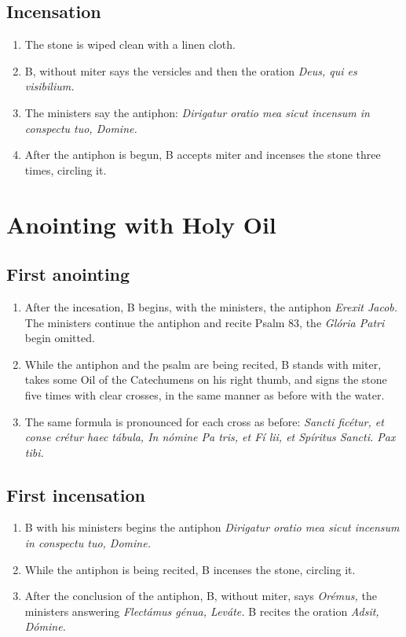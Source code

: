 \documentclass[twocolumn]{report}
\begin{document}
\subsection{Incensation}
\begin{enumerate}
	\item The stone is wiped clean with a linen cloth.
	\item B, without miter says the versicles and then the oration \textit{Deus, qui es visibilium.}
	\item The ministers say the antiphon: \textit{Dirigatur oratio mea sicut incensum in conspectu tuo, Domine.}
	\item After the antiphon is begun, B accepts miter and incenses the stone three times, circling it.
\end{enumerate}
\section{Anointing with Holy Oil}
\subsection{First anointing}
\begin{enumerate}
	\item After the incesation, B begins, with the ministers, the antiphon \textit{Erexit Jacob.} The ministers continue the antiphon and recite Psalm 83, the \textit{Glória Patri} begin omitted.
	\item While the antiphon and the psalm are being recited, B stands with miter, takes some Oil of the Catechumens on his right thumb, and signs the stone five times with clear crosses, in the same manner as before with the water. 
	\item The same formula is pronounced for each cross as before: \textit{Sancti  ficétur, et conse  crétur haec tábula, In nómine Pa  tris, et Fí  lii, et Spíritus  Sancti. Pax tibi.}
\end{enumerate}
\subsection{First incensation}
\begin{enumerate}
	\item B with his ministers begins the antiphon \textit{Dirigatur oratio mea sicut incensum in conspectu tuo, Domine.}
	\item While the antiphon is being recited, B incenses the stone, circling it.
	\item After the conclusion of the antiphon, B, without miter, says \textit{Orémus,} the ministers answering \textit{Flectámus génua, Leváte.} B recites the oration \textit{Adsit, Dómine.}
\end{enumerate}
\end{document}
